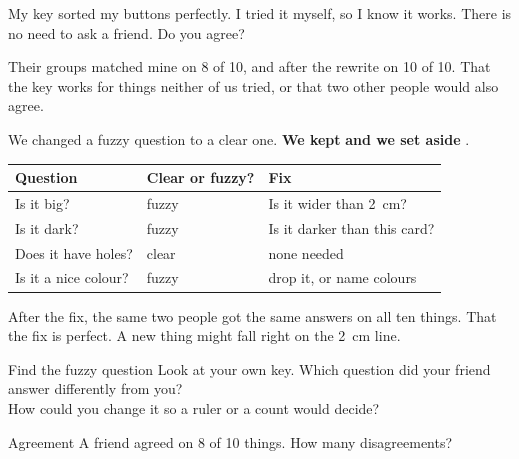 \begin{multix}[hmm]\multixbot[hmm]\tcblower
My key sorted my buttons perfectly. I tried it myself, so I know it works. There is no need to ask a friend. Do you agree?
\end{multix}

{Their groups matched mine on 8 of 10, and after the rewrite on 10 of 10.}
{That the key works for things neither of us tried, or that two other people would also agree.}

\begin{keepbox}
We changed a fuzzy question to a clear one. \textbf{We kept} \wline[3.4cm] \textbf{and we set aside} \wline[3.4cm].
\end{keepbox}

\clearpage

\begin{center}
\sffamily\small\renewcommand{\arraystretch}{1.5}
\begin{tabular}{@{}p{3.8cm}p{3.4cm}p{3.4cm}@{}}
\toprule
\textbf{Question} & \textbf{Clear or fuzzy?} & \textbf{Fix}\\
\midrule
Is it big? & fuzzy & Is it wider than 2~cm?\\
Is it dark? & fuzzy & Is it darker than this card?\\
Does it have holes? & clear & none needed\\
Is it a nice colour? & fuzzy & drop it, or name colours\\
\bottomrule
\end{tabular}
\end{center}

{After the fix, the same two people got the same answers on all ten things.}
{That the fix is perfect. A new thing might fall right on the 2~cm line.}

\begin{tryit}{Find the fuzzy question}
Look at your own key. Which question did your friend answer differently from you? \wline[6cm]\\[8pt]
How could you change it so a ruler or a count would decide? \wline[6cm]
\end{tryit}

\clearpage

\begin{puzzle}{Agreement}
A friend agreed on 8 of 10 things. How many disagreements? \wline[1.6cm]
\end{puzzle}

